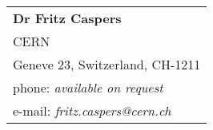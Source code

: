 \documentclass[margin,line]{resume}
\begin{document}
\begin{resume}
\begin{tabular}{@{}p{6cm}}
\textbf{Dr Fritz Caspers}           \\
CERN                    		         \\
Geneve 23, Switzerland, CH-1211 \\      
phone: \textsl{available on request} \\  
e-mail: \textsl{fritz.caspers@cern.ch} \\
\end{tabular}



\end{resume}
\end{document}
